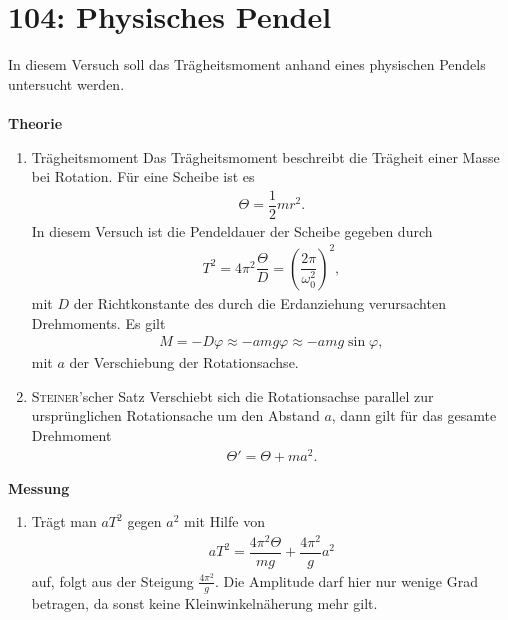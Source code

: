 \section{104: Physisches Pendel}
In diesem Versuch soll das Trägheitsmoment anhand eines physischen Pendels untersucht werden.\\\\
\textbf{Theorie} 
\begin{enumerate}[label=--]
        \item Trägheitsmoment \hspace{25pt} 
                Das Trägheitsmoment beschreibt die Trägheit einer Masse bei Rotation.
                Für eine Scheibe ist es
                \begin{align} 
                        \Theta =\dfrac{1}{2}mr^2
                .\end{align} 
                In diesem Versuch ist die Pendeldauer der Scheibe gegeben durch
                \begin{align} 
                        T^2=4\pi ^2\dfrac{\Theta }{D}=\left(\dfrac{2\pi }{\omega _0^2}\right)^2
                ,\end{align} 
                mit $D$ der Richtkonstante des durch die Erdanziehung verursachten Drehmoments. 
                Es gilt
                \begin{align} 
                        M=-D\varphi \approx -amg\varphi \approx -amg\sin \varphi 
                ,\end{align} 
                mit $a$ der Verschiebung der Rotationsachse. 
        \item \textsc{Steiner}'scher Satz \hspace{25pt} 
                Verschiebt sich die Rotationsachse parallel zur ursprünglichen Rotationsache um den Abstand $a$, dann gilt für das gesamte Drehmoment
                \begin{align} 
                        \Theta '=\Theta +ma^2
                .\end{align} 
\end{enumerate}
\textbf{Messung} 
\begin{enumerate}[label=--]
        \item Trägt man $aT^2$ gegen $a^2$ mit Hilfe von
                \begin{align} 
                        aT^2=\dfrac{4\pi ^2\Theta }{mg}+\dfrac{4\pi ^2}{g}a^2
                \end{align} 
                auf, folgt aus der Steigung $\tfrac{4\pi ^2}{g}$.
                Die Amplitude darf hier nur wenige Grad betragen, da sonst keine Kleinwinkelnäherung mehr gilt.
\end{enumerate}

